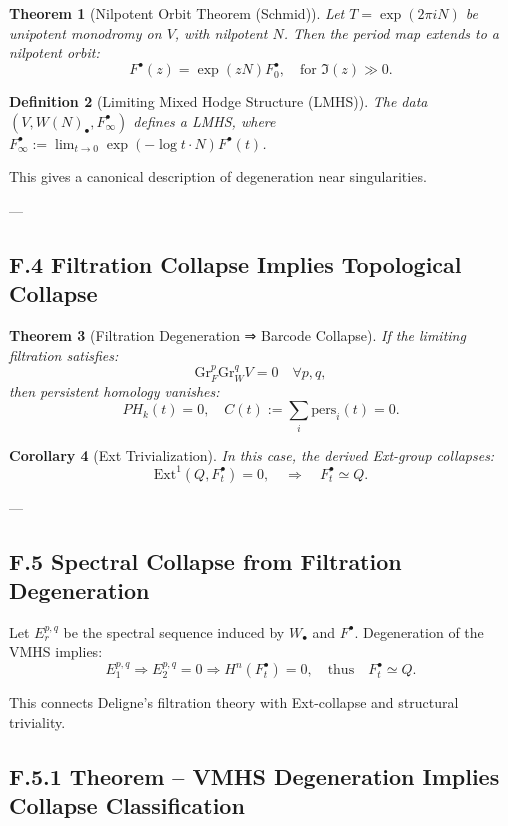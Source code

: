 \documentclass[11pt]{article}
\newtheorem{theorem}{Theorem}[section]
\newtheorem{definition}[theorem]{Definition}
\newtheorem{corollary}[theorem]{Corollary}
\begin{document}
\begin{theorem}[Nilpotent Orbit Theorem (Schmid)]
Let $T = \exp(2\pi i N)$ be unipotent monodromy on $V$, with nilpotent $N$. Then the period map extends to a nilpotent orbit:
\[
F^\bullet(z) = \exp(z N) F^\bullet_0,
\quad \text{for } \Im(z) \gg 0.
\]
\end{theorem}

\begin{definition}[Limiting Mixed Hodge Structure (LMHS)]
The data $(V, W(N)_\bullet, F^\bullet_\infty)$ defines a LMHS,  
where $F^\bullet_\infty := \lim_{t \to 0} \exp(-\log t \cdot N) F^\bullet(t)$.
\end{definition}

This gives a canonical description of degeneration near singularities.

---

\subsection*{F.4 Filtration Collapse Implies Topological Collapse}

\begin{theorem}[Filtration Degeneration ⇒ Barcode Collapse]
If the limiting filtration satisfies:
\[
\mathrm{Gr}_F^p \mathrm{Gr}_W^q V = 0 \quad \forall p,q,
\]
then persistent homology vanishes:
\[
PH_k(t) = 0, \quad C(t) := \sum_i \text{pers}_i(t) = 0.
\]
\end{theorem}

\begin{corollary}[Ext Trivialization]
In this case, the derived Ext-group collapses:
\[
\mathrm{Ext}^1(Q, F^\bullet_t) = 0,
\quad \Rightarrow \quad
F^\bullet_t \simeq Q.
\]
\end{corollary}

---

\subsection*{F.5 Spectral Collapse from Filtration Degeneration}

Let $E_r^{p,q}$ be the spectral sequence induced by $W_\bullet$ and $F^\bullet$.  
Degeneration of the VMHS implies:
\[
E_1^{p,q} \Rightarrow E_2^{p,q} = 0 \Rightarrow H^n(F^\bullet_t) = 0,
\quad \text{thus} \quad F^\bullet_t \simeq Q.
\]

This connects Deligne’s filtration theory with Ext-collapse and structural triviality.


\subsection*{F.5.1 Theorem – VMHS Degeneration Implies Collapse Classification}
\end{document}
